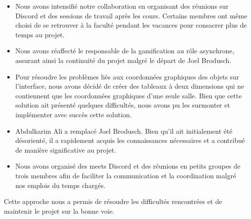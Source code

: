 \documentclass{article}
\begin{document}
\begin{itemize}
\item Nous avons intensifié notre collaboration en organisant des réunions sur Discord et des sessions de travail après les cours. Certains membres ont même choisi de se retrouver à la faculté pendant les vacances pour consacrer plus de temps au projet.
\item Nous avons réaffecté le responsable de la gamification au rôle asynchrone, assurant ainsi la continuité du projet malgré le départ de Joel Brodusch.
\item Pour résoudre les problèmes liés aux coordonnées graphiques des objets sur l'interface, nous avons décidé de créer des tableaux à deux dimensions qui ne contiennent que les coordonnées graphiques d'une seule salle. Bien que cette solution ait présenté quelques difficultés, nous avons pu les surmonter et implémenter avec succès cette solution.
\item Abdulkarim Ali a remplacé Joel Brodusch. Bien qu'il ait initialement été désorienté, il a rapidement acquis les connaissances nécessaires et a contribué de manière significative au projet.
\item Nous avons organisé des meets Discord et des réunions en petits groupes de trois membres afin de faciliter la communication et la coordination malgré nos emplois du temps chargés.
\end{itemize}

Cette approche nous a permis de résoudre les difficultés rencontrées et de maintenir le projet sur la bonne voie.
\end{document}
